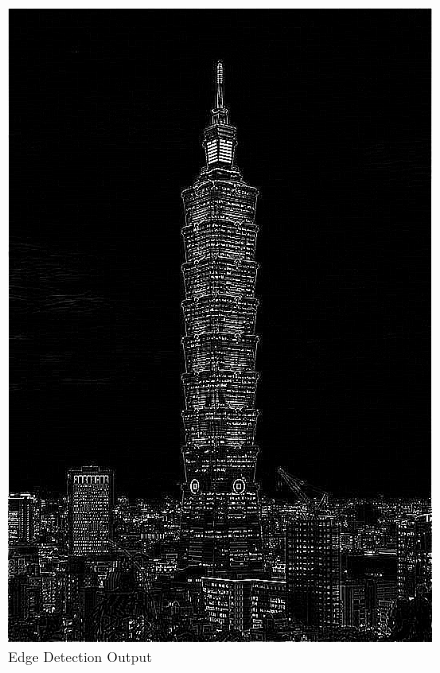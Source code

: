 \documentclass[12pt,a4paper]{report}
\begin{document}
\begin{figure}[!htb]
\begin{minipage}{0.49\textwidth}
    \includegraphics[width=0.9\linewidth]{result_img/taipei101_Q2.png}
    \caption{Edge Detection Output}\label{Fig:Data3}
  \end{minipage}
  \begin{minipage}{0.49\textwidth}
    \centering

\end{minipage}
\end{figure}
\end{document}
